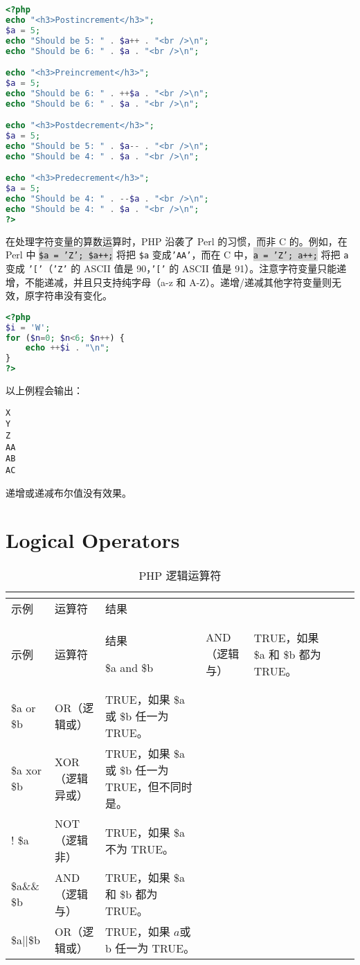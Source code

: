 \begin{lstlisting}[language=PHP]
<?php
echo "<h3>Postincrement</h3>";
$a = 5;
echo "Should be 5: " . $a++ . "<br />\n";
echo "Should be 6: " . $a . "<br />\n";

echo "<h3>Preincrement</h3>";
$a = 5;
echo "Should be 6: " . ++$a . "<br />\n";
echo "Should be 6: " . $a . "<br />\n";

echo "<h3>Postdecrement</h3>";
$a = 5;
echo "Should be 5: " . $a-- . "<br />\n";
echo "Should be 4: " . $a . "<br />\n";

echo "<h3>Predecrement</h3>";
$a = 5;
echo "Should be 4: " . --$a . "<br />\n";
echo "Should be 4: " . $a . "<br />\n";
?>
\end{lstlisting}

在处理字符变量的算数运算时，PHP 沿袭了 Perl 的习惯，而非 C 的。例如，在 Perl 中 \colorbox{lightgray}{\texttt{\$a = 'Z'; \$a++;}} 将把 \texttt{\$a} 变成\texttt{'AA'}，而在 C 中，\colorbox{lightgray}{\texttt{a = 'Z'; a++;}} 将把 \texttt{a} 变成 \texttt{'['}（\texttt{'Z'} 的 ASCII 值是 90，\texttt{'['} 的 ASCII 值是 91）。注意字符变量只能递增，不能递减，并且只支持纯字母（a-z 和 A-Z）。递增/递减其他字符变量则无效，原字符串没有变化。

\begin{lstlisting}[language=PHP]
<?php
$i = 'W';
for ($n=0; $n<6; $n++) {
    echo ++$i . "\n";
}
?>
\end{lstlisting}

以上例程会输出：

\begin{verbatim}
X
Y
Z
AA
AB
AC
\end{verbatim}

递增或递减布尔值没有效果。




\section{Logical Operators}



\begin{longtable}{|l|l|l|}
\tabularnewline\hline
示例&运算符		&结果
\endhead

\caption{PHP 逻辑运算符}\\
\hline
示例&运算符		&结果
\endfirsthead

\endfoot

\endlastfoot
\hline
\$a and \$b&AND（逻辑与）&TRUE，如果 \$a 和 \$b 都为 TRUE。\\
\hline
\$a or \$b 	&OR（逻辑或）&TRUE，如果 \$a 或 \$b 任一为 TRUE。\\
\hline
\$a xor \$b&XOR（逻辑异或）&TRUE，如果 \$a 或 \$b 任一为 TRUE，但不同时是。\\
\hline
! \$a &NOT（逻辑非）&TRUE，如果 \$a 不为 TRUE。\\
\hline
\$a\&\&	\$b&AND（逻辑与）&TRUE，如果 \$a 和 \$b 都为 TRUE。\\
\hline
\$a||\$b&OR（逻辑或）		& TRUE，如果 $a 或 $b 任一为 TRUE。\\
\hline
\end{longtable}


